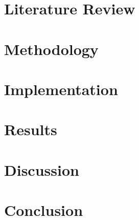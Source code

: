 \documentclass[12pt,a4paper]{article}
\begin{document}



\section{Literature Review}

\section{Methodology}

\section{Implementation}

\section{Results}

\section{Discussion}

\section{Conclusion}


\printbibliography
\end{document}
